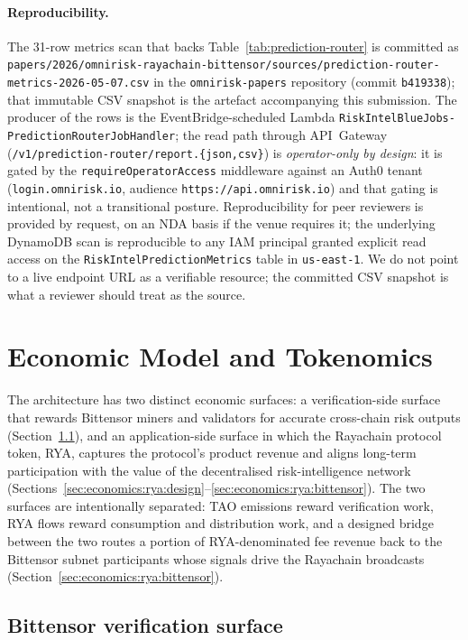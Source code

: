 \documentclass[11pt,a4paper]{article}
\begin{document}
\paragraph{Reproducibility.} The 31-row metrics scan that backs
Table~\ref{tab:prediction-router} is committed as
\texttt{papers/2026/omnirisk-rayachain-bittensor/sources/prediction-router-metrics-2026-05-07.csv}
in the \texttt{omnirisk-papers} repository (commit \texttt{b419338}); that
immutable CSV snapshot is the artefact accompanying this submission. The
producer of the rows is the EventBridge-scheduled Lambda
\texttt{RiskIntelBlueJobs-PredictionRouterJobHandler}; the read path through
API~Gateway (\texttt{/v1/prediction-router/report.\{json,csv\}}) is
\emph{operator-only by design}: it is gated by the
\texttt{requireOperatorAccess} middleware against an Auth0 tenant
(\texttt{login.omnirisk.io}, audience \texttt{https://api.omnirisk.io}) and
that gating is intentional, not a transitional posture. Reproducibility for
peer reviewers is provided by request, on an NDA basis if the venue requires
it; the underlying DynamoDB scan is reproducible to any IAM principal granted
explicit read access on the \texttt{RiskIntelPredictionMetrics} table in
\texttt{us-east-1}. We do not point to a live endpoint URL as a verifiable
resource; the committed CSV snapshot is what a reviewer should treat as the
source.

\section{Economic Model and Tokenomics}\label{sec:economics}

The architecture has two distinct economic surfaces: a verification-side surface that
rewards Bittensor miners and validators for accurate cross-chain risk outputs
(Section~\ref{sec:economics:bittensor}), and an application-side surface in which
the Rayachain protocol token, \textsc{RYA}, captures the protocol's product revenue
and aligns long-term participation with the value of the decentralised
risk-intelligence network
(Sections~\ref{sec:economics:rya:design}--\ref{sec:economics:rya:bittensor}). The two
surfaces are intentionally separated: TAO emissions reward verification work, RYA
flows reward consumption and distribution work, and a designed bridge between the
two routes a portion of RYA-denominated fee revenue back to the Bittensor subnet
participants whose signals drive the Rayachain broadcasts
(Section~\ref{sec:economics:rya:bittensor}).

\subsection{Bittensor verification surface}\label{sec:economics:bittensor}
\end{document}
